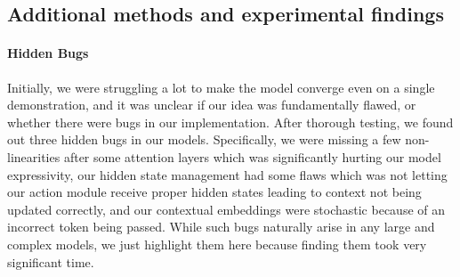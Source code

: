 \documentclass[11pt,a4paper]{article}
\begin{document}


\subsection{Additional methods and experimental findings}
\label{ssec:add-exp}
\paragraph{Hidden Bugs} 
Initially, we were struggling a lot to make the model converge even on a single demonstration, and it was unclear if our idea was fundamentally flawed, or whether there were bugs in our implementation. After thorough testing, we found out three hidden bugs in our models. Specifically, we were missing a few non-linearities after some attention layers which was significantly hurting our model expressivity, our hidden state management had some flaws which was not letting our action module receive proper hidden states leading to context not being updated correctly, and our contextual embeddings were stochastic because of an incorrect token being passed. While such bugs naturally arise in any large and complex models, we just highlight them here because finding them took very significant time.
\end{document}
